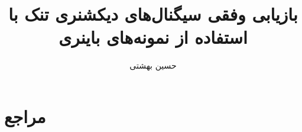 \documentclass{beamer}
\begin{document}
\title{بازیابی وفقی سیگنال‌های دیکشنری تنک با استفاده از نمونه‌های باینری}
\subtitle{}
\author{حسین بهشتی}


\begin{frame}
\maketitle
\end{frame}


\section{مراجع\hfill}
\begin{frame}[t,allowframebreaks]

\begin{latin}

\end{latin}
\end{frame}
\end{document}
